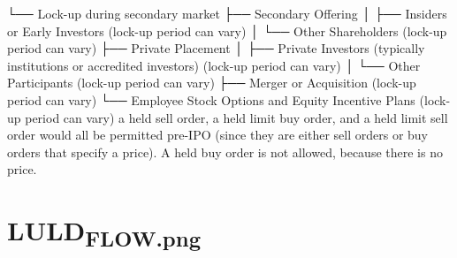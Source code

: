 \documentclass[11pt]{article}
\begin{document}
└── Lock-up during secondary market
    ├── Secondary Offering
    │   ├── Insiders or Early Investors (lock-up period can vary)
    │   └── Other Shareholders (lock-up period can vary)
    ├── Private Placement
    │   ├── Private Investors (typically institutions or accredited investors) (lock-up period can vary)
    │   └── Other Participants (lock-up period can vary)
    ├── Merger or Acquisition (lock-up period can vary)
    └── Employee Stock Options and Equity Incentive Plans (lock-up period can vary)
a held sell order, a held limit buy order,
and a held limit sell order would all be permitted pre-IPO (since they are either sell orders or
buy orders that specify a price). A held buy order is not allowed, because there is no price.

\section{LULD\textsubscript{FLOW.png}}
\label{sec:org261da98}
\end{document}
